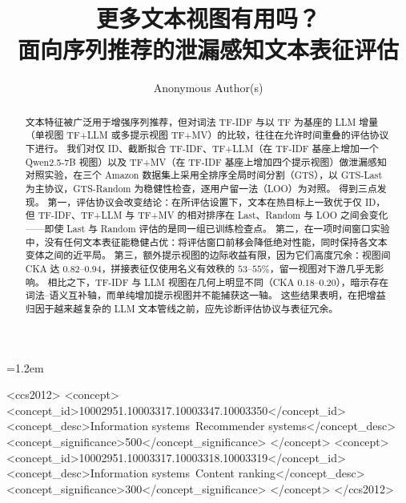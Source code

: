 \documentclass[sigconf,natbib=true,anonymous]{acmart}
\newcommand{\tfidf}{\textsc{TF-IDF}\xspace}
\newcommand{\tfllm}{\textsc{TF+LLM}\xspace}
\newcommand{\tfmv}{\textsc{TF+MV}\xspace}
\begin{document}
\emergencystretch=1.2em

\title{更多文本视图有用吗？\\
面向序列推荐的泄漏感知文本表征评估}

\author{Anonymous Author(s)}
\renewcommand{\shortauthors}{Anonymous}

\begin{abstract}
文本特征被广泛用于增强序列推荐，但对词法 \tfidf 与以 TF 为基座的 LLM 增量（单视图 \tfllm 或多提示视图 \tfmv）的比较，往往在允许时间重叠的评估协议下进行。
我们对仅 ID、截断拟合 \tfidf、\tfllm（在 \tfidf 基座上增加一个 Qwen2.5-7B 视图）以及 \tfmv（在 \tfidf 基座上增加四个提示视图）做泄漏感知对照实验，在三个 Amazon 数据集上采用全排序全局时间分割（GTS），以 GTS-Last 为主协议，GTS-Random 为稳健性检查，逐用户留一法（LOO）为对照。
得到三点发现。
第一，评估协议会改变结论：在所评估设置下，文本在热目标上一致优于仅 ID，但 \tfidf、\tfllm 与 \tfmv 的相对排序在 Last、Random 与 LOO 之间会变化——即使 Last 与 Random 评估的是同一组已训练检查点。
第二，在一项时间窗口实验中，没有任何文本表征能稳健占优：将评估窗口前移会降低绝对性能，同时保持各文本变体之间的近平局。
第三，额外提示视图的边际收益有限，因为它们高度冗余：视图间 CKA 达 $0.82$--$0.94$，拼接表征仅使用名义有效秩的 $53$--$55\%$，留一视图对下游几乎无影响。
相比之下，TF-IDF 与 LLM 视图在几何上明显不同（CKA $0.18$--$0.20$），暗示存在词法--语义互补轴，而单纯增加提示视图并不能捕获这一轴。
这些结果表明，在把增益归因于越来越复杂的 LLM 文本管线之前，应先诊断评估协议与表征冗余。
\end{abstract}

\begin{CCSXML}
<ccs2012>
 <concept>
  <concept_id>10002951.10003317.10003347.10003350</concept_id>
  <concept_desc>Information systems~Recommender systems</concept_desc>
  <concept_significance>500</concept_significance>
 </concept>
 <concept>
  <concept_id>10002951.10003317.10003318.10003319</concept_id>
  <concept_desc>Information systems~Content ranking</concept_desc>
  <concept_significance>300</concept_significance>
 </concept>
</ccs2012>
\end{CCSXML}

\end{document}
